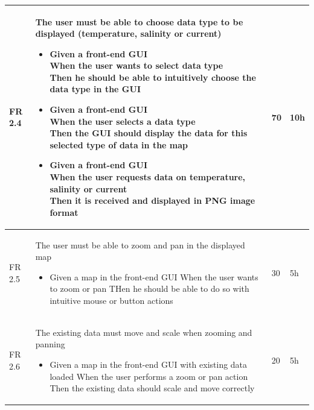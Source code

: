\documentclass[11pt,a4paper,titlepage,oneside]{report}
\begin{document}
\begin{longtable}{p{1.4cm} p{7.8cm} p{1cm} p{1cm} }
  FR 2.4 & The user must be able to choose data type to be displayed (temperature, salinity or current)
  \begin{itemize}
  \item \parbox[t]{6.8cm}{
        Given a front-end GUI \\
        When the user wants to select data type \\
        Then he should be able to intuitively choose the data type in the GUI}
  \item \parbox[t]{6.8cm}{
        Given a front-end GUI \\
        When the user selects a data type \\
        Then the GUI should display the data for this selected type of data in the map}
  \item \parbox[t]{6.8cm}{
        Given a front-end GUI \\
        When the user requests data on temperature, salinity or current \\
        Then it is received and displayed in PNG image format}
  \end{itemize}
  & 70 & 10h \\ \hline

  FR 2.5 & The user must be able to zoom and pan in the displayed map
  \begin{itemize}
  \item \parbox[t]{6.8cm}{
        Given a map in the front-end GUI
        When the user wants to zoom or pan
        THen he should be able to do so with intuitive mouse or button actions}
  \end{itemize}
  & 30 & 5h \\ \hline

  FR 2.6 & The existing data must move and scale when zooming and panning
  \begin{itemize}
  \item \parbox[t]{6.8cm}{
        Given a map in the front-end GUI with existing data loaded
        When the user performs a zoom or pan action
        Then the existing data should scale and move correctly}
  \end{itemize}
  & 20 & 5h \\ \hline


\end{longtable}
\end{document}
